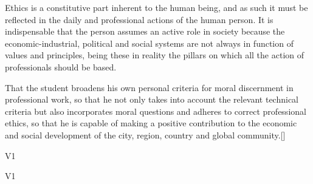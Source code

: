 \begin{syllabus}


\begin{justification}
	Ethics is a constitutive part inherent to the human being, and as such it must be reflected in the daily and professional actions of the human person. It is indispensable that the person assumes an active role in society because the economic-industrial, political and social systems are not always in function of values and principles, being these in reality the pillars on which all the action of professionals should be based.
\end{justification}

\begin{goals}
\item That the student broadens his own personal criteria for moral discernment in professional work, so that he not only takes into account the relevant technical criteria but also incorporates moral questions and adheres to correct professional ethics, so that he is capable of making a positive contribution to the economic and social development of the city, region, country and global community.[\Usage]
\end{goals}

\begin{outcomes}{V1}
    \item {}
    \item {}
	\item {}
\end{outcomes}

\begin{competences}{V1}
    \item {}
    \item {}
    \item {}
    \item {}
\end{competences}


\end{syllabus}
